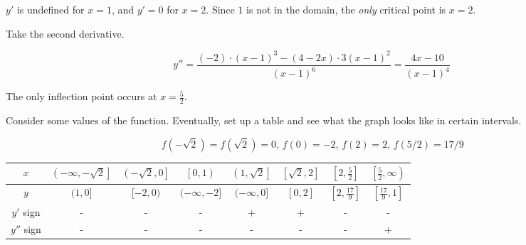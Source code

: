 \documentclass{article}
\begin{document}
\hfill

\noindent $y'$ is undefined for $x=1$, and $y'=0$ for $x=2$. Since $1$ is not in the domain, the \textit{only} critical point is $x = 2$.

\hfill

\noindent Take the second derivative.

\begin{equation*}y'' = \frac{(-2)\cdot(x-1)^3-(4-2x)\cdot3(x-1)^2 }{(x-1)^6}=\frac{4x-10}{(x-1)^4}\end{equation*}

\hfill

\noindent The only inflection point occurs at $\displaystyle x=\frac52$.

\hfill

\noindent Consider some values of the function. Eventually, set up a table and see what the graph looks like in certain intervals.

\begin{equation*}\,f\left(-\sqrt2\right)=f\left(\sqrt2\right)=0,\,f(0)=-2,\,f(2)=2,\,f(5/2)=17/9\end{equation*}

\begin{center}
    \large
    \begin{tabular}{ |c| c c c c c c c| } 
    \hline
        $x$ & $\left(-\infty, -\sqrt2\right]$ & $\left(-\sqrt2, 0\right]$&$\left[0, 1\right)$ & $\left(1,\sqrt2\right]$ & $\left[\sqrt2, 2\right]$ & $\left[2, \frac52\right]$ & $\left[\frac52, \infty\right)$  \\
        \hline
        $y$ & $(1, 0]$ &$[-2,0)$ & $(-\infty, -2]$& $(-\infty, 0]$& $[0, 2]$& $\left[2, \frac{17}9\right]$& $\left[\frac{17}9,1\right]$\\
        \hline
        $y'$ sign & - & - & - &+&+&-&- \\
        \hline
        $y''$ sign & - &- &-&-&-&-&+ \\
        \hline
    \end{tabular}
\end{center}

\hfill

\begin{center}
\end{center}
\end{document}
